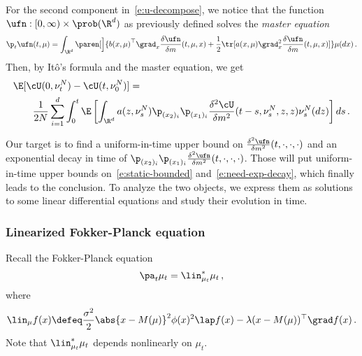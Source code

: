 \documentclass{amsart}
\begin{document}
For the second component in~\eqref{e:u-decompose}, we notice that the function $\ufn: [0,\infty) \times \prob(\R^d)$ as previously defined solves the \emph{master equation}~\cite{BuckdahnLiPengRainer2017,CarmonaDelarue2018II} 
\begin{equation}
	\label{e:master}
	\p_t \ufn(t,\mu) = \int_{\R^d} \paren[\Big]{ {b(x,\mu)}^\top \grad_x \frac{\delta \ufn}{\delta m}(t,\mu,x) + \frac{1}{2} \tr[ a(x,\mu) \grad^2_x \frac{\delta \ufn}{\delta m}(t,\mu,x)  ]  } \mu(dx) \,.
\end{equation}
Then, by It\^{o}'s formula and the master equation, we get 
\begin{align}
    \nonumber
    & \E [\cU(0,\nu^N_t) - \cU(t,\nu^N_0)] = \\
    \label{e:need-exp-decay}
    & \qquad \frac{1}{2N} \sum_{i=1}^d \int_0^t \E \left[ \int_{\R^d}  a(z, \nu^N_s) \p_{(x_2)_i} \p_{(x_1)_i} \frac{\delta^2 \cU}{\delta m^2} (t-s,\nu^N_s,z,z) \nu^N_s(dz)  \right] ds \,.
\end{align}

Our target is to find a uniform-in-time upper bound on $\frac{\delta^2 \ufn}{\delta m^2}(t,\cdot,\cdot,\cdot)$ and an exponential decay in time of $\p_{(x_2)_i} \p_{(x_1)_i} \frac{\delta^2 \ufn}{\delta m^2}(t,\cdot,\cdot,\cdot)$.
Those will put uniform-in-time upper bounds on~\eqref{e:static-bounded} and~\eqref{e:need-exp-decay}, which finally leads to the conclusion. 
To analyze the two objects, we express them as solutions to some linear differential equations and study their evolution in time. 


\subsubsection{Linearized Fokker-Planck equation}

Recall the Fokker-Planck equation 
\begin{equation*}
	\pa_t \mu_t = \lin_{\mu_t}^\ast \mu_t \,,
\end{equation*}
where 
\begin{equation*}
    \lin_{\mu} f(x) \defeq \frac{\sigma^2}{2} \abs{x - M(\mu)}^2 \phi(x)^2 \lap f(x) - \lambda (x-M(\mu))^\top \grad f(x)  \,.
\end{equation*}
Note that $\lin_{\mu_t}^\ast \mu_t$ depends nonlinearly on $\mu_t$. 
\end{document}
